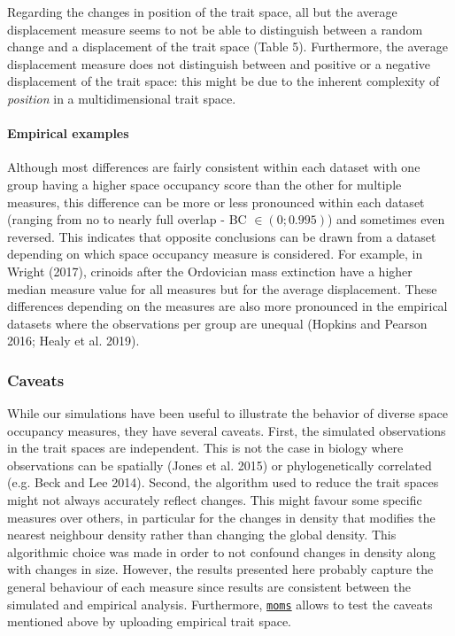 \documentclass[]{article}
\let\oldparagraph\paragraph
\renewcommand{\paragraph}[1]{\oldparagraph{#1}\mbox{}}
\begin{document}
Regarding the changes in position of the trait space, all but the
average displacement measure seems to not be able to distinguish between
a random change and a displacement of the trait space (Table 5).
Furthermore, the average displacement measure does not distinguish
between and positive or a negative displacement of the trait space: this
might be due to the inherent complexity of \emph{position} in a
multidimensional trait space.

\paragraph{Empirical examples}\label{empirical-examples-1}

Although most differences are fairly consistent within each dataset with
one group having a higher space occupancy score than the other for
multiple measures, this difference can be more or less pronounced within
each dataset (ranging from no to nearly full overlap - BC
\(\in(0;0.995)\)) and sometimes even reversed. This indicates that
opposite conclusions can be drawn from a dataset depending on which
space occupancy measure is considered. For example, in Wright (2017),
crinoids after the Ordovician mass extinction have a higher median
measure value for all measures but for the average displacement. These
differences depending on the measures are also more pronounced in the
empirical datasets where the observations per group are unequal (Hopkins
and Pearson 2016; Healy et al. 2019).

\subsubsection{Caveats}\label{caveats}

While our simulations have been useful to illustrate the behavior of
diverse space occupancy measures, they have several caveats. First, the
simulated observations in the trait spaces are independent. This is not
the case in biology where observations can be spatially (Jones et al.
2015) or phylogenetically correlated (e.g. Beck and Lee 2014). Second,
the algorithm used to reduce the trait spaces might not always
accurately reflect changes. This might favour some specific measures
over others, in particular for the changes in density that modifies the
nearest neighbour density rather than changing the global density. This
algorithmic choice was made in order to not confound changes in density
along with changes in size. However, the results presented here probably
capture the general behaviour of each measure since results are
consistent between the simulated and empirical analysis. Furthermore,
\href{https://tguillerme.shinyapps.io/moms/}{\texttt{moms}} allows to
test the caveats mentioned above by uploading empirical trait space.
\end{document}
